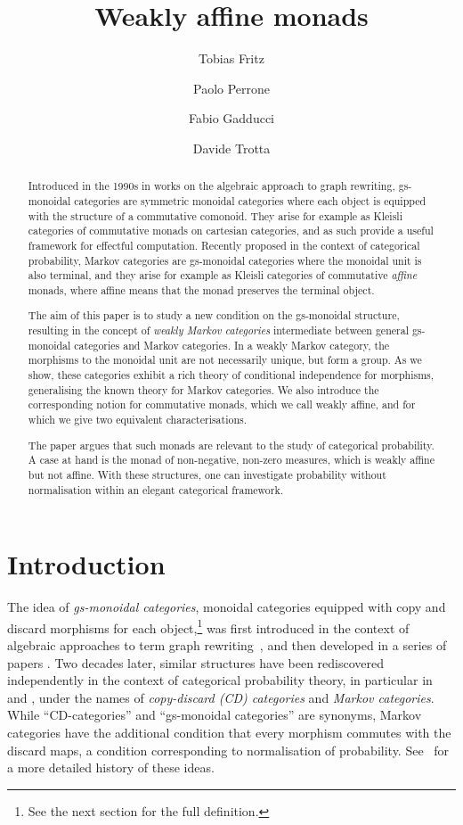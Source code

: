 \documentclass[a4paper,UKenglish,numberwithinsect,cleveref, autoref, thm-restate]{lipics-v2021}
\title{Weakly affine monads}
\author{Tobias Fritz}{Department of Mathematics, University of Innsbruck, AT}{tobias.fritz@uibk.ac.at}{}{}
\author{Paolo Perrone}{Department of Computer Science, University of Oxford, UK}{paolo.perrone@cs.ox.ac.uk}{https://orcid.org/0000-0002-9123-9089}{}
\author{Fabio Gadducci}{Department of Computer Science, University of Pisa, Pisa, IT}{fabio.gadducci@unipi.it}{https://orcid.org/
0000-0003-0690-3051}{MIUR PRIN 2017FTXR ``IT-MaTTerS''.}
\author{ Davide Trotta }{Department of Computer Science, University of Pisa, Pisa, IT}{trottadavide92@gmail.com}{https://orcid.org/0000-0003-4509-594X}{MIUR PRIN 2017FTXR ``IT-MaTTerS''.}
\theoremstyle{plain} %
\theoremstyle{definition} %
\begin{document}
\maketitle

\begin{abstract}
   Introduced in the 1990s in works on the algebraic approach to graph rewriting, 
   gs-monoidal categories are symmetric monoidal categories 
   where each object is equipped with the structure of a commutative comonoid. They arise for example as 
   Kleisli categories of commutative monads on cartesian categories, 
   and as such provide a useful framework for effectful computation. 
   Recently proposed in the context of categorical probability, Markov categories are
   gs-monoidal categories where the monoidal unit is also terminal, and they arise for example as
   Kleisli categories of commutative \emph{affine} monads, where affine means that the monad preserves the terminal object.

   The aim of this paper is to study a new condition on the gs-monoidal structure, resulting in the concept of \emph{weakly Markov categories} intermediate between general 
   gs-monoidal categories and Markov categories. 
   In a weakly Markov category, the morphisms to the monoidal unit are not necessarily unique, but form a group.
   As we show, these categories exhibit a 
   rich theory of conditional independence for morphisms, generalising the known theory for Markov categories. We also introduce the corresponding 
   notion for commutative monads, which we call weakly affine, and for which we give two equivalent
   characterisations.

   The paper argues that such monads are relevant to the study of categorical probability.
   A case at hand is the monad of non-negative, non-zero measures, which is weakly affine but not affine. 
   With these structures, one can investigate probability without normalisation within an elegant categorical framework.
\end{abstract}

\section{Introduction}

The idea of \emph{gs-monoidal categories}, monoidal categories equipped with copy and discard morphisms for each object,\footnote{See the next section for the full definition.} was first introduced in the context of algebraic approaches to term graph rewriting~\cite{CorradiniGadducci97}, and then
developed in a series of papers \cite{CorradiniGadducci99, CorradiniGadducci02, CorradiniGadducci99b}.
Two decades later, similar structures have been rediscovered independently in the context of categorical probability theory, in particular in \cite{cho_jacobs_2019} and \cite{Fritz_2020}, under the names of \emph{copy-discard (CD) categories} and \emph{Markov categories}.
While ``CD-categories'' and ``gs-monoidal categories'' are synonyms, Markov categories have the additional condition that every morphism commutes with the discard maps, a condition corresponding to normalisation of probability. See~\cite[Remark~2.2]{fritz2022} for a more detailed history of these ideas. 
\end{document}
